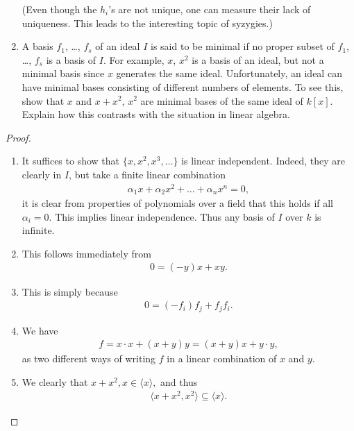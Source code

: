 \begin{exercise}{6}
\begin{enumerate}
    (Even though the $h_i$'s are not unique, one can measure their lack of uniqueness. 
    This leads to the interesting topic of syzygies.)
    \item A basis $f_1$, \dots, $f_s$ of an ideal $I$ is said to be minimal if no proper subset of $f_1$, \dots, $f_s$ is a basis of $I$. 
    For example, $x$, $x^2$ is a basis of an ideal, but not a minimal basis since $x$ generates the same ideal. 
    Unfortunately, an ideal can have minimal bases consisting of different numbers of elements. 
    To see this, show that $x$ and $x+x^2$, $x^2$ are minimal bases of the same ideal of $k[x]$. 
    Explain how this contrasts with the situation in linear algebra.
\end{enumerate}
\end{exercise}
\begin{proof}
    \begin{enumerate}
        \item It suffices to show that $\{x,x^2,x^3, \dots\}$ is linear independent. 
        Indeed, they are clearly in $I$, but take a finite linear combination
        \begin{align*}
            \alpha_1 x + \alpha_2 x^2 + \dots + \alpha_n x^n = 0,
        \end{align*}
        it is clear from properties of polynomials over a field that this holds if all $\alpha_i = 0$. 
        This implies linear independence. 
        Thus any basis of $I$ over $k$ is infinite.
        \item This follows immediately from
        \begin{align*}
            0 = (-y)x + xy.
        \end{align*}
        \item This is simply because
        \begin{align*}
            0 = (-f_i)f_j + f_jf_i.
        \end{align*}
        \item We have
        \begin{align*}
            f = x\cdot x + (x+y)y = (x+y)x + y\cdot y,
        \end{align*}
        as two different ways of writing $f$ in a linear combination of $x$ and $y$.
    \item We clearly that
    $x+x^2, x\in \langle x\rangle,$
    and thus
    \begin{align*}
        \langle x+x^2, x^2\rangle \subseteq \langle x\rangle.
    \end{align*}

\end{enumerate}
\end{proof}
